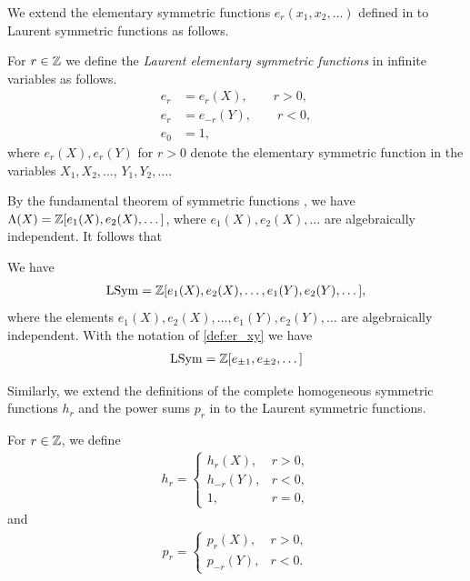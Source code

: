 \documentclass[11pt]{amsart}
\begin{document}
We extend the elementary symmetric functions $e_r(x_1, x_2, \dots)$ defined in \cite[Ch.~I, \S2, p.~19]{Mac15} to Laurent symmetric functions as follows.
\begin{defin} \label{def:er_xy}
    For $r \in \mathbb{Z}$ we define the \emph{Laurent elementary symmetric functions} in infinite variables as follows. 
    \begin{align*}
        e_r &= e_r(X), \qquad r> 0, \\
        e_{r} &= e_{-r}(Y), \qquad r< 0, \\
        e_0 &= 1,
    \end{align*}
    where $e_r(X), e_r(Y)$ for $r>0$ denote the elementary symmetric function in the variables $X_1, X_2, \dots $, $Y_1, Y_2, \dots$.
\end{defin}
By the fundamental theorem of symmetric functions
\cite[Ch.~I, \S2]{Mac15}, we have
$\Lambda(X)=\mathbb{Z}[e_1(X),e_2(X),\dots]$,
where $e_1(X),e_2(X),\dots$ are algebraically independent.
 It follows that
\begin{prop}\label{prop:ebasis}
    We have
    \begin{align*}
        \mathrm{LSym} = \mathbb{Z}[ e_1(X),e_2(X),\dots,e_1(Y),e_2(Y),\dots ],
    \end{align*}
where the elements \(e_1(X),e_2(X),\dots,e_1(Y),e_2(Y),\dots\) are algebraically independent.
With the notation of \cref{def:er_xy} we have
\begin{align}
    \mathrm{LSym} = \mathbb{Z}[ e_{\pm 1},e_{\pm 2},\dots]
\end{align}
\end{prop}

Similarly, we extend the definitions of the complete homogeneous symmetric functions $h_r$ and the power sums $p_r$ in \cite[Ch.~I, \S2 pp.21-23]{Mac15} to the Laurent symmetric functions. 
\begin{defin}\label{def:hr_pr}
    For $r \in \mathbb{Z}$, we define 
    \begin{align}
        h_r = \begin{cases}
            h_r(X), & r > 0, \\
            h_{-r}(Y), & r<0, \\
            1, &  r=0,
        \end{cases}
    \end{align}
    and 
    \begin{align}
        p_r = \begin{cases}
            p_r(X), &r > 0, \\
            p_{-r}(Y), & r<0.
        \end{cases}
    \end{align}
\end{defin}
\end{document}
